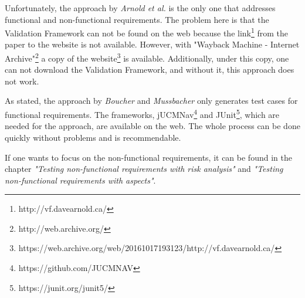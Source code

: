 Unfortunately, the approach by \textit{Arnold et al.} is the only one that addresses functional and non-functional requirements. The problem here is that the Validation Framework can not be found on the web because the link\footnote{http://vf.davearnold.ca/} from the paper to the website is not available. However, with "Wayback Machine - Internet Archive"\footnote{http://web.archive.org/} a copy of the website\footnote{https://web.archive.org/web/20161017193123/http://vf.davearnold.ca/} is available. Additionally, under this copy, one can not download the Validation Framework, and without it, this approach does not work.  

As stated, the approach by \textit{Boucher} and \textit{Mussbacher} only generates test cases for functional requirements. The frameworks, jUCMNav\footnote{https://github.com/JUCMNAV} and JUnit\footnote{https://junit.org/junit5/}, which are needed for the approach, are available on the web. The whole process can be done quickly without problems and is recommendable.

If one wants to focus on the non-functional requirements, it can be found in the chapter \textit{"Testing non-functional requirements with risk analysis"} and \textit{"Testing non-functional requirements with aspects"}.
